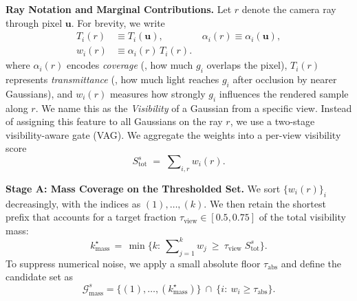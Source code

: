 \textbf{Ray Notation and Marginal Contributions.}
Let $r$ denote the camera ray through pixel $\mathbf{u}$. For brevity, we write
\begin{equation}
\label{eq:visibility_weights}
\begin{aligned}
T_i(r) &\equiv T_i(\mathbf{u}), 
\quad\quad\quad\quad \alpha_i(r) \equiv \alpha_i(\mathbf{u}), \\
w_i(r) &\equiv \alpha_i(r)\,T_i(r).
\end{aligned}
\end{equation}
where $\alpha_i(r)$ encodes \emph{coverage} (\ie, how much $g_i$ overlaps the pixel), $T_i(r)$ represents \emph{transmittance} (\ie, how much light reaches $g_i$ after occlusion by nearer Gaussians), and $w_i(r)$ measures how strongly $g_i$ influences the rendered sample along $r$. We name this as the \emph{Visibility} of a Gaussian from a specific view. Instead of assigning this feature to all Gaussians on the ray $r$, we use a two-stage visibility-aware gate (VAG).
We aggregate the weights into a per-view visibility score
\begin{equation}
S_{\mathrm{tot}}^s \;=\; \sum\nolimits_{i, r} w_i(r) .
\label{eq:view_score}
\end{equation}

\textbf{Stage A: Mass Coverage on the Thresholded Set.}  
We sort $\{w_i(r)\}_i$ decreasingly, with the indices as $(1),\ldots,(k)$. 
We then retain the shortest prefix that accounts for a target fraction $\tau_{\mathrm{view}}\!\in\![0.5,0.75]$ of the total visibility mass:
\begin{equation}
k_{\mathrm{mass}}^\star
\,=\,
\min\Big\{k:\ \sum\nolimits_{j=1}^{k} w_{j} \ \ge\ \tau_{\mathrm{view}}\; S_{\mathrm{tot}}^{s} \Big\}.
\end{equation}
To suppress numerical noise, we apply a small absolute floor $\tau_{\mathrm{abs}}$ and define the candidate set as
\begin{equation}
\mathcal{G}_{\mathrm{mass}}^{s}
=
\Big\{ (1),\ldots,(k_{\mathrm{mass}}^\star) \Big\}
\ \cap\
\big\{ i:\ w_i \ge \tau_{\mathrm{abs}} \big\}.
\label{eq:mass_floor}
\end{equation}




